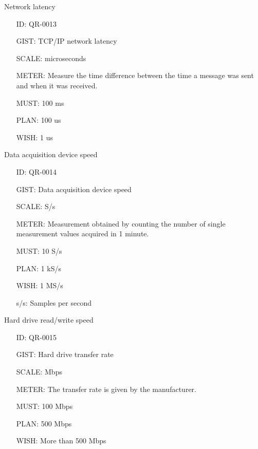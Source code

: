         Network latency

        \begin{itemize}
          \setlength{\itemindent}{.5in}
          \itemsep .15em
          \item[ID:] QR-0013
          \item[GIST:] TCP/IP network latency
          \item[SCALE:] microseconds
          \item[METER:] Measure the time difference between the time a message
            was sent and when it was received.
          \item[MUST:] 100 ms
          \item[PLAN:] 100 us
          \item[WISH:] 1 us
        \end{itemize}

        \newpage

        Data acquisition device speed

        \begin{itemize}
          \setlength{\itemindent}{.5in}
          \itemsep .15em
          \item[ID:] QR-0014
          \item[GIST:] Data acquisition device speed
          \item[SCALE:] S/s
          \item[METER:] Measurement obtained by counting the number of single
            measurement values acquired in 1 minute.
          \item[MUST:] 10 S/s
          \item[PLAN:] 1 kS/s
          \item[WISH:] 1 MS/s
          \item[s/s:] Samples per second
        \end{itemize}

        Hard drive read/write speed

        \begin{itemize}
          \setlength{\itemindent}{.5in}
          \itemsep .15em
          \item[ID:] QR-0015
          \item[GIST:] Hard drive transfer rate
          \item[SCALE:] Mbps
          \item[METER:] The transfer rate is given by the manufacturer.
          \item[MUST:] 100 Mbps
          \item[PLAN:] 500 Mbps
          \item[WISH:] More than 500 Mbps
        \end{itemize}


